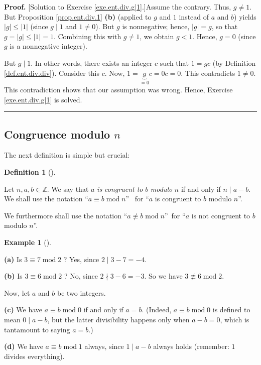 \documentclass[numbers=enddot,12pt,final,onecolumn,notitlepage]{scrartcl}%
\numberwithin{exer}{subsection}
\theoremstyle{definition}
\newtheorem{defi}[theo]{Definition}
\newenvironment{definition}[1][]
{\begin{defi}[#1]\begin{leftbar}}
{\end{leftbar}\end{defi}}
\newtheorem{exam}[theo]{Example}
\newenvironment{example}[1][]
{\begin{exam}[#1]\begin{leftbar}}
{\end{leftbar}\end{exam}}
\newenvironment{fineprint}{\begin{small}}{\end{small}}
\newenvironment{proof}[1][Proof]{\noindent\textbf{#1.} }{\ \rule{0.5em}{0.5em}}
\begin{document}
\begin{fineprint}
\begin{proof}
[Solution to Exercise \ref{exe.ent.div.g|1}.]Assume the contrary. Thus,
$g\neq1$. But Proposition \ref{prop.ent.div.1} \textbf{(b)} (applied to $g$
and $1$ instead of $a$ and $b$) yields $\left\vert g\right\vert \leq\left\vert
1\right\vert $ (since $g\mid1$ and $1\neq0$). But $g$ is nonnegative; hence,
$\left\vert g\right\vert =g$, so that $g=\left\vert g\right\vert
\leq\left\vert 1\right\vert =1$. Combining this with $g\neq1$, we obtain
$g<1$. Hence, $g=0$ (since $g$ is a nonnegative integer).

But $g\mid1$. In other words, there exists an integer $c$ such that $1=gc$ (by
Definition \ref{def.ent.div.div}). Consider this $c$. Now, $1=\underbrace{g}%
_{=0}c=0c=0$. This contradicts $1\neq0$. This contradiction shows that our
assumption was wrong. Hence, Exercise \ref{exe.ent.div.g|1} is solved.
\end{proof}
\end{fineprint}

\subsection{Congruence modulo $n$}

The next definition is simple but crucial:

\begin{definition}
\label{def.ent.cong}Let $n,a,b\in\mathbb{Z}$. We say that $a$ \textit{is
congruent to }$b$ \textit{modulo }$n$ if and only if $n\mid a-b$. We shall use
the notation \textquotedblleft$a\equiv b\operatorname{mod}n$\textquotedblright%
\ for \textquotedblleft$a$ is congruent to $b$ modulo $n$\textquotedblright.

We furthermore shall use the notation \textquotedblleft$a\not \equiv
b\operatorname{mod}n$\textquotedblright\ for \textquotedblleft$a$ is not
congruent to $b$ modulo $n$\textquotedblright.
\end{definition}

\begin{example}
\label{exa.ent.cong.triv}\textbf{(a)} Is $3\equiv7\operatorname{mod}2$ ? Yes,
since $2\mid3-7=-4$.

\textbf{(b)} Is $3\equiv6\operatorname{mod}2$ ? No, since $2\nmid3-6=-3$. So
we have $3\not \equiv 6\operatorname{mod}2$.

Now, let $a$ and $b$ be two integers.

\textbf{(c)} We have $a\equiv b\operatorname{mod}0$ if and only if $a=b$.
(Indeed, $a\equiv b\operatorname{mod}0$ is defined to mean $0\mid a-b$, but
the latter divisibility happens only when $a-b=0$, which is tantamount to
saying $a=b$.)

\textbf{(d)} We have $a\equiv b\operatorname{mod}1$ always, since $1\mid a-b$
always holds (remember: $1$ divides everything).
\end{example}
\end{document}
